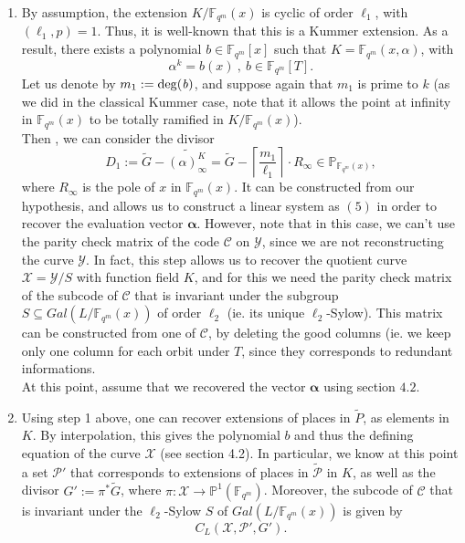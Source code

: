 \documentclass[10pt]{article}
\newcommand{\cd}{\cdot}
\newcommand{\fqm}{\mathbb{F}_{q^m}}
\newcommand{\su}{\subseteq}
\newcommand{\X}{\mathcal{X}}
\newcommand{\Y}{\mathcal{Y}}
\newcommand{\PR}{\mathcal{P}}
\begin{document}
\begin{enumerate}
\item By assumption, the extension $K/\fqm(x)$ is cyclic of order $\ell_1$, with $(\ell_1,p)=1$. Thus, it is well-known that this is a Kummer extension. As a result, there exists a polynomial $b \in \fqm[x]$ such that $K = \fqm(x,\alpha)$, with
\[ \alpha^k = b(x) \ , \ b \in \fqm[T].\] Let us denote by $m_1:=\rm{deg}\it (b)$, and suppose again that $m_1$ is prime to $k$ (as we did in the classical Kummer case, note that it allows the point at infinity in $\fqm(x)$ to be totally ramified in $K/\fqm(x)$). \\ Then , we can consider the divisor
\[D_1 := \tilde{G} - \widetilde{(\alpha)^K_{\infty}} = \tilde{G} - \left\lceil\frac{m_1}{\ell_1}\right\rceil \cd R_{\infty} \in \mathbb{P}_{\fqm(x)},\]
where $R_{\infty}$ is the pole of $x$ in $\fqm(x)$. It can be constructed from our hypothesis, and allows us to construct a linear system as $(5)$ in order to recover the evaluation vector $\boldsymbol{\alpha}$. However, note that in this case, we can't use the parity check matrix of the code $\mathcal{C}$ on $\Y$, since we are not reconstructing the curve $\Y$. In fact, this step allows us to recover the quotient curve $\X = \Y/S$ with function field $K$, and for this we need the parity check matrix of the subcode of $\mathcal{C}$ that is invariant under the subgroup $S \su Gal(L/\fqm(x))$ of order $\ell_2$ (ie. its unique $\ell_2$-Sylow). This matrix can be constructed from one of $\mathcal{C}$, by deleting the good columns (ie. we keep only one column for each orbit under $T$, since they corresponds to redundant informations. \\
At this point, assume that we recovered the vector $\boldsymbol{\alpha}$ using section $4.2$.

\item Using step 1 above, one can recover extensions of places in $\tilde{P}$, as elements in $K$. By interpolation, this gives the polynomial $b$ and thus the defining equation of the curve $\X$ (see section 4.2). In particular, we know at this point a set $\PR'$ that corresponds to extensions of places in $\tilde{\PR}$ in $K$, as well as the divisor $G' := \pi^*\tilde{G}$, where $\pi : \X \rightarrow \mathbb{P}^1(\fqm)$. Moreover, the subcode of $\mathcal{C}$ that is invariant under the $\ell_2$-Sylow $S$ of $Gal(L/\fqm(x))$ is given by 
\[C_L(\X,\PR',G').\]


\end{enumerate}
\end{document}
